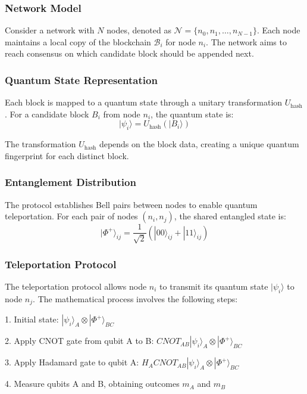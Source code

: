 \documentclass[11pt,a4paper]{article}
\begin{document}
\subsubsection{Network Model}
Consider a network with $N$ nodes, denoted as $\mathcal{N} = \{n_0, n_1, \ldots, n_{N-1}\}$. Each node maintains a local copy of the blockchain $\mathcal{B}_i$ for node $n_i$. The network aims to reach consensus on which candidate block should be appended next.

\subsubsection{Quantum State Representation}
Each block is mapped to a quantum state through a unitary transformation $U_{\text{hash}}$. For a candidate block $B_i$ from node $n_i$, the quantum state is:
\begin{equation}
|\psi_i\rangle = U_{\text{hash}}(|B_i\rangle)
\end{equation}

The transformation $U_{\text{hash}}$ depends on the block data, creating a unique quantum fingerprint for each distinct block.

\subsubsection{Entanglement Distribution}
The protocol establishes Bell pairs between nodes to enable quantum teleportation. For each pair of nodes $(n_i, n_j)$, the shared entangled state is:
\begin{equation}
|\Phi^+\rangle_{ij} = \frac{1}{\sqrt{2}}(|00\rangle_{ij} + |11\rangle_{ij})
\end{equation}

\subsubsection{Teleportation Protocol}
The teleportation protocol allows node $n_i$ to transmit its quantum state $|\psi_i\rangle$ to node $n_j$. The mathematical process involves the following steps:

1. Initial state: $|\psi_i\rangle_A \otimes |\Phi^+\rangle_{BC}$

2. Apply CNOT gate from qubit A to B: $CNOT_{AB}|\psi_i\rangle_A \otimes |\Phi^+\rangle_{BC}$

3. Apply Hadamard gate to qubit A: $H_A CNOT_{AB}|\psi_i\rangle_A \otimes |\Phi^+\rangle_{BC}$

4. Measure qubits A and B, obtaining outcomes $m_A$ and $m_B$
\end{document}
